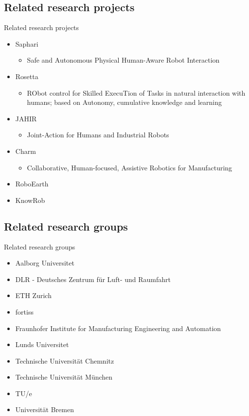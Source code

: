 \subsection{Related research projects}
\begin{frame}{Related research projects}
	\begin{itemize}
		\item Saphari
		\begin{itemize}
			\item Safe and Autonomous Physical Human-Aware Robot Interaction
		\end{itemize}
		\item Rosetta
		\begin{itemize}
			\item RObot control for Skilled ExecuTion of Tasks in natural interaction with humans; based on Autonomy, cumulative knowledge and learning
		\end{itemize}
		\item JAHIR
		\begin{itemize}
			\item Joint-Action for Humans and Industrial Robots
		\end{itemize}
		\item Charm
		\begin{itemize}
			\item Collaborative, Human-focused, Assistive Robotics for Manufacturing
		\end{itemize}
		\item RoboEarth
		\item KnowRob
	\end{itemize}
\end{frame}

\subsection{Related research groups}
\begin{frame}{Related research groups}
	\begin{itemize}
		\item Aalborg Universitet
		\item DLR - Deutsches Zentrum für Luft- und Raumfahrt
		\item ETH Zurich
		\item fortiss
		\item Fraunhofer Institute for Manufacturing Engineering and Automation
		\item Lunds Universitet
		\item Technische Universität Chemnitz
		\item Technische Universität München
		\item TU/e
		\item Universität Bremen
	\end{itemize}
\end{frame}

